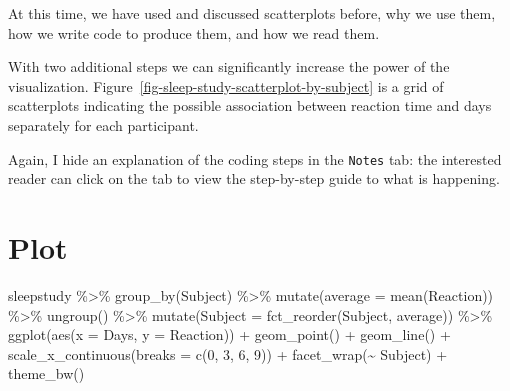 \documentclass[
  letterpaper,
  DIV=11,
  numbers=noendperiod]{scrreprt}
\newenvironment{Shaded}{\begin{snugshade}}{\end{snugshade}}
\newcommand{\AttributeTok}[1]{\textcolor[rgb]{0.40,0.45,0.13}{#1}}
\newcommand{\DecValTok}[1]{\textcolor[rgb]{0.68,0.00,0.00}{#1}}
\newcommand{\FunctionTok}[1]{\textcolor[rgb]{0.28,0.35,0.67}{#1}}
\newcommand{\NormalTok}[1]{\textcolor[rgb]{0.00,0.23,0.31}{#1}}
\newcommand{\SpecialCharTok}[1]{\textcolor[rgb]{0.37,0.37,0.37}{#1}}
\begin{document}
At this time, we have used and discussed scatterplots before, why we use
them, how we write code to produce them, and how we read them.

With two additional steps we can significantly increase the power of the
visualization. Figure~\ref{fig-sleep-study-scatterplot-by-subject} is a
grid of scatterplots indicating the possible association between
reaction time and days separately for each participant.

Again, I hide an explanation of the coding steps in the \texttt{Notes}
tab: the interested reader can click on the tab to view the step-by-step
guide to what is happening.

\section{Plot}

\begin{Shaded}
\begin{Highlighting}[]
\NormalTok{sleepstudy }\SpecialCharTok{\%\textgreater{}\%}
  \FunctionTok{group\_by}\NormalTok{(Subject) }\SpecialCharTok{\%\textgreater{}\%}
  \FunctionTok{mutate}\NormalTok{(}\AttributeTok{average =} \FunctionTok{mean}\NormalTok{(Reaction)) }\SpecialCharTok{\%\textgreater{}\%}
  \FunctionTok{ungroup}\NormalTok{() }\SpecialCharTok{\%\textgreater{}\%}
  \FunctionTok{mutate}\NormalTok{(}\AttributeTok{Subject =} \FunctionTok{fct\_reorder}\NormalTok{(Subject, average)) }\SpecialCharTok{\%\textgreater{}\%}
  \FunctionTok{ggplot}\NormalTok{(}\FunctionTok{aes}\NormalTok{(}\AttributeTok{x =}\NormalTok{ Days, }\AttributeTok{y =}\NormalTok{ Reaction)) }\SpecialCharTok{+}
  \FunctionTok{geom\_point}\NormalTok{() }\SpecialCharTok{+} 
  \FunctionTok{geom\_line}\NormalTok{() }\SpecialCharTok{+}
  \FunctionTok{scale\_x\_continuous}\NormalTok{(}\AttributeTok{breaks =} \FunctionTok{c}\NormalTok{(}\DecValTok{0}\NormalTok{, }\DecValTok{3}\NormalTok{, }\DecValTok{6}\NormalTok{, }\DecValTok{9}\NormalTok{)) }\SpecialCharTok{+}
  \FunctionTok{facet\_wrap}\NormalTok{(}\SpecialCharTok{\textasciitilde{}}\NormalTok{ Subject) }\SpecialCharTok{+}
  \FunctionTok{theme\_bw}\NormalTok{()}
\end{Highlighting}
\end{Shaded}
\end{document}
